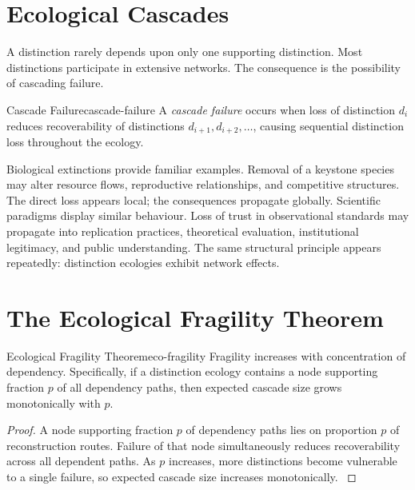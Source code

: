 \documentclass[12pt,twoside,openright]{book}
\begin{document}
\section{Ecological Cascades}
\label{sec:ch12-cascades}

A distinction rarely depends upon only one supporting
distinction. Most distinctions participate in extensive
networks. The consequence is the possibility of cascading
failure.

\begin{definition}{Cascade Failure}{cascade-failure}
  A \emph{cascade failure} occurs when loss of distinction
  $d_i$ reduces recoverability of distinctions
  $d_{i+1},d_{i+2},\ldots$, causing sequential distinction
  loss throughout the ecology.
\end{definition}

Biological extinctions provide familiar examples. Removal
of a keystone species may alter resource flows,
reproductive relationships, and competitive structures. The
direct loss appears local; the consequences propagate
globally. Scientific paradigms display similar behaviour.
Loss of trust in observational standards may propagate into
replication practices, theoretical evaluation, institutional
legitimacy, and public understanding. The same structural
principle appears repeatedly: distinction ecologies exhibit
network effects.

\section{The Ecological Fragility Theorem}
\label{sec:ch12-fragility}

\begin{theorem}{Ecological Fragility Theorem}{eco-fragility}
  Fragility increases with concentration of dependency.
  Specifically, if a distinction ecology contains a node
  supporting fraction $p$ of all dependency paths, then
  expected cascade size grows monotonically with $p$.
\end{theorem}

\begin{proof}
  A node supporting fraction $p$ of dependency paths lies
  on proportion $p$ of reconstruction routes. Failure of
  that node simultaneously reduces recoverability across
  all dependent paths. As $p$ increases, more distinctions
  become vulnerable to a single failure, so expected
  cascade size increases monotonically.
  \parencite{may1973,levin1998}
\end{proof}
\end{document}
